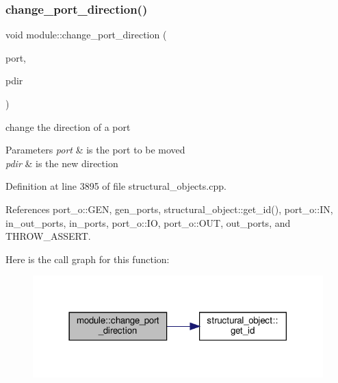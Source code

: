 \subsubsection{\texorpdfstring{change\+\_\+port\+\_\+direction()}{change\_port\_direction()}}
{\footnotesize\ttfamily void module\+::change\+\_\+port\+\_\+direction (\begin{DoxyParamCaption}\item[{\hyperlink{structural__objects_8hpp_a8ea5f8cc50ab8f4c31e2751074ff60b2}{structural\+\_\+object\+Ref}}]{port,  }\item[{\hyperlink{structport__o_adb254df5665ff28b0769491cc3899fd5}{port\+\_\+o\+::port\+\_\+direction}}]{pdir }\end{DoxyParamCaption})}



change the direction of a port 


\begin{DoxyParams}{Parameters}
{\em port} & is the port to be moved \\
\hline
{\em pdir} & is the new direction \\
\hline
\end{DoxyParams}


Definition at line 3895 of file structural\+\_\+objects.\+cpp.



References port\+\_\+o\+::\+G\+EN, gen\+\_\+ports, structural\+\_\+object\+::get\+\_\+id(), port\+\_\+o\+::\+IN, in\+\_\+out\+\_\+ports, in\+\_\+ports, port\+\_\+o\+::\+IO, port\+\_\+o\+::\+O\+UT, out\+\_\+ports, and T\+H\+R\+O\+W\+\_\+\+A\+S\+S\+E\+RT.

Here is the call graph for this function\+:
\nopagebreak
\begin{figure}[H]
\begin{center}
\leavevmode
\includegraphics[width=318pt]{d0/dd3/classmodule_acb5a667c85804bef3a6097febf367893_cgraph}
\end{center}
\end{figure}
\mbox{\label{classmodule_ac19167af53d30fe69ccc16881cd61425}} 
